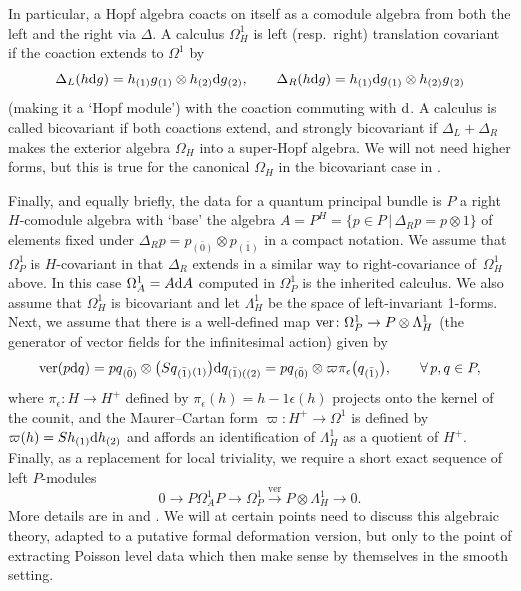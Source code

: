 \documentclass[pdftex]{sigma}
\numberwithin{equation}{section}
\newcommand{\<}{{\langle}}
\renewcommand{\>}{{\rangle}}
\newcommand{\tens}{\otimes}
\renewcommand{\o}{{}_{\scriptstyle(1)}}
\renewcommand{\t}{{}_{\scriptstyle(2)}}
\newcommand{\extd}{{\rm d}}
\newcommand{\eps}{\epsilon}
\newcommand{\co}{{}_{\scriptstyle \bar{(1)}}}
\newcommand{\rz}{{}_{\scriptstyle \bar{(0)}}}
\begin{document}
In particular, a Hopf algebra coacts on itself as a comodule algebra from both the left and the right via $\Delta$. A calculus $\Omega^1_H$ is left (resp.\ right) translation covariant if the coaction extends to $\Omega^1$ by
\[\Delta_L(h\extd g)=h\o g\o\tens h\t \extd g\t,\qquad \Delta_R(h\extd g)=h\o \extd g\o\tens h\t g\t\]
(making it a `Hopf module') with the coaction commuting with $\extd$. A calculus is called bicovariant if both coactions extend, and strongly bicovariant if $\Delta_L+\Delta_R$ makes the exterior algebra $\Omega_H$ into a super-Hopf algebra. We will not need higher forms, but this is true for the canonical $\Omega_H$ in the bicovariant case in \cite{Wor}.

Finally, and equally briefly, the data for a quantum principal bundle is $P$ a right $H$-comodule algebra with `base' the algebra $A=P^H=\{p\in P\, |\, \Delta_Rp=p\tens 1\}$ of elements fixed under $\Delta_Rp=p\rz \tens p\co $ in a compact notation. We assume that $\Omega^1_P$ is $H$-covariant in that $\Delta_R$ extends in a similar way to right-covariance of~$\Omega^1_H$ above. In this case $\Omega^1_A=A\extd A$ computed in $\Omega^1_P$ is the inherited calculus. We also assume that $\Omega^1_H$ is bicovariant and let $\Lambda^1_H$ be the space of left-invariant 1-forms. Next, we assume that there is a well-defined map ${\rm ver}\colon \Omega^1_P\to P\tens \Lambda^1_H$ (the generator of vector fields for the infinitesimal action) given by
\begin{equation}\label{PHver} \text{ver}(p\extd q)=pq\rz \tens\big(Sq\co\o \big)\extd q_{\bar{(1)}((2)}=pq\rz\tens\varpi \pi_\eps\big(q\co\big), \qquad \forall\, p,q\in P, \end{equation}
where $\pi_\eps\colon H\to H^+$ defined by $\pi_\eps(h)=h-1\eps(h)$ projects onto the kernel of the counit, and the Maurer--Cartan form $\varpi \colon H^+\to \Omega^1$ is defined by $\varpi (h)=Sh\o\extd h\t$ and affords an identification of $\Lambda^1_H$ as a quotient of $H^+$. Finally, as a replacement for local triviality, we require a short exact sequence of left $P$-modules
\begin{equation}\label{PHexact} 0\longrightarrow P\Omega^1_AP\longrightarrow \Omega^1_P\xrightarrow{\text{ver}}P\tens\Lambda^1_H\longrightarrow 0. \end{equation}
More details are in \cite{BrzMa, Ma:spin} and \cite[Chapter~5]{BegMa}. We will at certain points need to discuss this algebraic theory, adapted to a putative formal deformation version, but only to the point of extracting Poisson level data which then make sense by themselves in the smooth setting.
\end{document}
